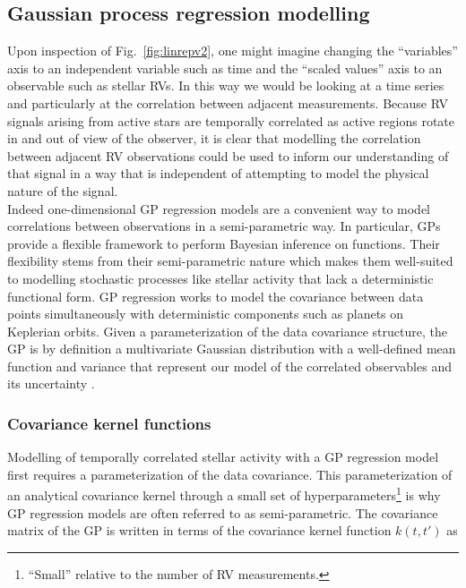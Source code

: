 \subsection{Gaussian process regression modelling} \label{sect:regression}
Upon inspection of Fig.~\ref{fig:linrepv2}, one might imagine changing the ``variables''
axis to an independent variable such as time and the ``scaled values'' axis to an
observable such as stellar RVs. In this way we would be looking at a time series and
particularly at the correlation between adjacent measurements. 
Because RV signals arising from active stars are temporally
correlated as active regions rotate in and out of view of the observer, it is clear that
modelling the correlation between adjacent RV observations could be used to inform
our understanding of that signal in a way that is independent of attempting to
model the physical nature of the signal. \\

Indeed one-dimensional GP regression models are a convenient way to model
correlations between observations in a semi-parametric way. In particular, GPs provide a
flexible framework to perform Bayesian inference on functions. Their flexibility stems from
their semi-parametric nature which makes them well-suited to modelling stochastic processes
like stellar activity that lack a deterministic functional form. GP regression works to model
the covariance between data points simultaneously with deterministic components such as planets
on Keplerian orbits. Given a parameterization of the data covariance structure, the GP is
by definition a multivariate Gaussian distribution with a well-defined mean function and
variance that represent our model of the correlated observables and its uncertainty
\citep{rasmussen05}. \\

\subsubsection{Covariance kernel functions}
Modelling of temporally correlated stellar activity with a GP regression model first requires
a parameterization of the data covariance. This parameterization of an analytical
covariance kernel through a small set of hyperparameters\footnote{``Small''
  relative to the number of RV measurements.} is why GP regression models are often referred to
as semi-parametric. The covariance matrix of the GP is written in terms of the covariance kernel
function $k(t,t')$ as

